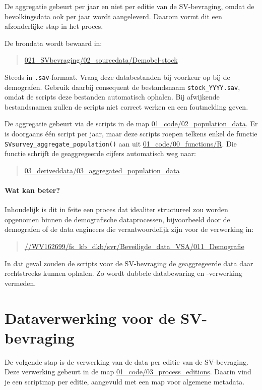 \documentclass{VSAnote}
\begin{document}
De aggregatie gebeurt per jaar en niet per editie van de SV-bevraging, omdat de bevolkingsdata ook per jaar wordt aangeleverd. Daarom vormt dit een afzonderlijke stap in het proces.

De brondata wordt bewaard in:
\begin{quote}
\url{021_SVbevraging/02_sourcedata/Demobel-stock}
\end{quote}
Steeds in \texttt{.sav}-formaat. Vraag deze databestanden bij voorkeur op bij de demografen. Gebruik daarbij consequent de bestandsnaam \verb+stock_YYYY.sav+, omdat de scripts deze bestanden automatisch ophalen. Bij afwijkende bestandsnamen zullen de scripts niet correct werken en een foutmelding geven.

De aggregatie gebeurt via de scripts in de map \url{01_code/02_population_data}. Er is doorgaans één script per jaar, maar deze scripts roepen telkens enkel de functie \verb+SVsurvey_aggregate_population()+ aan uit \url{01_code/00_functions/R}. Die functie schrijft de geaggregeerde cijfers automatisch weg naar:
\begin{quote}
\url{03_deriveddata/03_aggregated_population_data}
\end{quote}

\paragraph{Wat kan beter?}

Inhoudelijk is dit in feite een proces dat idealiter structureel zou worden opgenomen binnen de demografische dataprocessen, bijvoorbeeld door de demografen of de data engineers die verantwoordelijk zijn voor de verwerking in:
\begin{quote}
\url{//WV162699/fs_kb_dkb/svr/Beveiligde_data_VSA/011_Demografie}
\end{quote}
In dat geval zouden de scripts voor de SV-bevraging de geaggregeerde data daar rechtstreeks kunnen ophalen. Zo wordt dubbele databewaring en -verwerking vermeden.













\section{Dataverwerking voor de SV-bevraging}

De volgende stap is de verwerking van de data per editie van de SV-bevraging. Deze verwerking gebeurt in de map \url{01_code/03_process_editions}. Daarin vind je een scriptmap per editie, aangevuld met een map voor algemene metadata.
\end{document}
